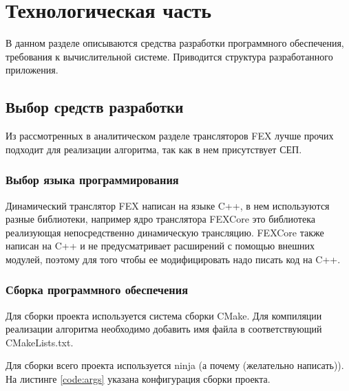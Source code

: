 \section{Технологическая часть}

В данном разделе описываются средства разработки программного обеспечения, требования к вычислительной системе. Приводится структура разработанного приложения.

\subsection{Выбор средств разработки}

Из рассмотренных в аналитическом разделе трансляторов FEX лучше прочих подходит для реализации алгоритма, так как в нем присутствует СЕП.

\subsubsection{Выбор языка программирования}

Динамический транслятор FEX написан на языке C++, в нем используются разные библиотеки, например ядро транслятора FEXCore это библиотека реализующая непосредственно динамическую трансляцию. FEXCore также написан на C++ и не предусматривает расширений с помощью внешних модулей, поэтому для того чтобы ее модифицировать надо писать код на C++.

\subsubsection{Сборка программного обеспечения}

Для сборки проекта используется система сборки
CMake. Для компиляции реализации алгоритма необходимо добавить имя файла в соответствующий CMakeLists.txt.

Для сборки всего проекта используется ninja (а почему (желательно написать)). На листинге \ref{code:args} указана конфигурация сборки проекта.


